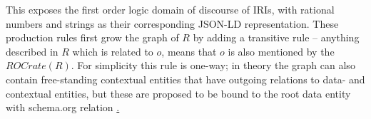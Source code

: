 This exposes the first order logic domain of discourse of IRIs, with rational numbers and strings as their corresponding JSON-LD representation. These production rules first grow the graph of $R$ by adding a transitive rule – anything described in $R$ which is related to $o$, means that $o$ is also mentioned by the $ROCrate(R)$. For simplicity this rule is one-way; in theory the graph can also contain free-standing contextual entities that have outgoing relations to data- and contextual entities, but these are proposed to be bound to the root data entity with schema.org relation \href{http://schema.org/mentions}.
